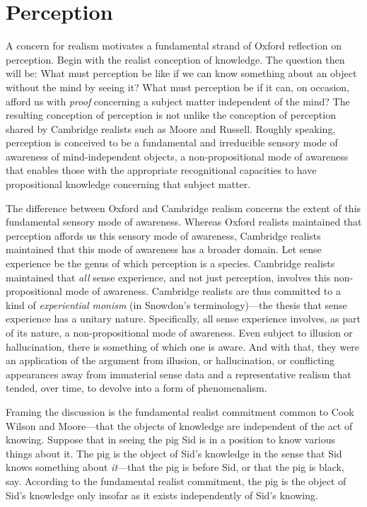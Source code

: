 
\section{Perception} %
\label{sec:perception}

A concern for realism motivates a fundamental strand of Oxford reflection on perception. Begin with the realist conception of knowledge.  The question then will be: What must perception be like if we can know something about an object without the mind by seeing it? What must perception be if it can, on occasion, afford us with \emph{proof} concerning a subject matter independent of the mind? The resulting conception of perception is not unlike the conception of perception shared by Cambridge realists such as Moore and Russell. Roughly speaking, perception is conceived to be a fundamental and irreducible sensory mode of awareness of mind-independent objects, a non-propositional mode of awareness that enables those with the appropriate recognitional capacities to have propositional knowledge concerning that subject matter. 

The difference between Oxford and Cambridge realism concerns the extent of this fundamental sensory mode of awareness. Whereas Oxford realists maintained that perception affords us this sensory mode of awareness, Cambridge realists maintained that this mode of awareness has a broader domain. Let sense experience be the genus of which perception is a species. Cambridge realists maintained that \emph{all} sense experience, and not just perception, involves this non-propositional mode of awareness. Cambridge realists are thus committed to a kind of \emph{experiential monism} (in Snowdon's \citeyear{Snowdon:2008oz} terminology)---the thesis that sense experience has a unitary nature. Specifically, all sense experience involves, as part of its nature, a non-propositional mode of awareness. Even subject to illusion or hallucination, there is something of which one is aware. And with that, they were an application of the argument from illusion, or hallucination, or conflicting appearances away from immaterial sense data and a representative realism that tended, over time, to devolve into a form of phenomenalism.

Framing the discussion is the fundamental realist commitment common to Cook Wilson and Moore---that the objects of knowledge are independent of the act of knowing. Suppose that in seeing the pig Sid is in a position to know various things about it. The pig is the object of Sid's knowledge in the sense that Sid knows something about \emph{it}---that the pig is before Sid, or that the pig is black, say. According to the fundamental realist commitment, the pig is the object of Sid's knowledge only insofar as it exists independently of Sid's knowing. 

